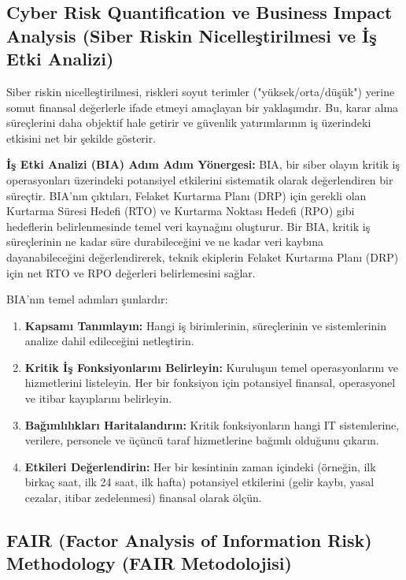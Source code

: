 \subsection{Cyber Risk Quantification ve Business Impact Analysis (Siber Riskin Nicelleştirilmesi ve İş Etki Analizi)}

Siber riskin nicelleştirilmesi, riskleri soyut terimler ("yüksek/orta/düşük") yerine somut finansal değerlerle ifade etmeyi amaçlayan bir yaklaşımdır. Bu, karar alma süreçlerini daha objektif hale getirir ve güvenlik yatırımlarının iş üzerindeki etkisini net bir şekilde gösterir.

\textbf{İş Etki Analizi (BIA) Adım Adım Yönergesi:}
BIA, bir siber olayın kritik iş operasyonları üzerindeki potansiyel etkilerini sistematik olarak değerlendiren bir süreçtir. BIA'nın çıktıları, Felaket Kurtarma Planı (DRP) için gerekli olan Kurtarma Süresi Hedefi (RTO) ve Kurtarma Noktası Hedefi (RPO) gibi hedeflerin belirlenmesinde temel veri kaynağını oluşturur. Bir BIA, kritik iş süreçlerinin ne kadar süre durabileceğini ve ne kadar veri kaybına dayanabileceğini değerlendirerek, teknik ekiplerin Felaket Kurtarma Planı (DRP) için net RTO ve RPO değerleri belirlemesini sağlar.

BIA'nın temel adımları şunlardır:
\begin{enumerate}
    \item \textbf{Kapsamı Tanımlayın:} Hangi iş birimlerinin, süreçlerinin ve sistemlerinin analize dahil edileceğini netleştirin.
    \item \textbf{Kritik İş Fonksiyonlarını Belirleyin:} Kuruluşun temel operasyonlarını ve hizmetlerini listeleyin. Her bir fonksiyon için potansiyel finansal, operasyonel ve itibar kayıplarını belirleyin.
    \item \textbf{Bağımlılıkları Haritalandırın:} Kritik fonksiyonların hangi IT sistemlerine, verilere, personele ve üçüncü taraf hizmetlerine bağımlı olduğunu çıkarın.
    \item \textbf{Etkileri Değerlendirin:} Her bir kesintinin zaman içindeki (örneğin, ilk birkaç saat, ilk 24 saat, ilk hafta) potansiyel etkilerini (gelir kaybı, yasal cezalar, itibar zedelenmesi) finansal olarak ölçün.
\end{enumerate}

\subsection{FAIR (Factor Analysis of Information Risk) Methodology (FAIR Metodolojisi)}

